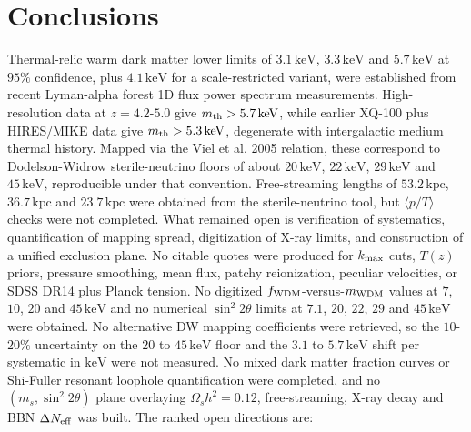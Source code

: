 \documentclass[11pt,a4paper]{article}
\begin{document}
\section{Conclusions}
Thermal-relic warm dark matter lower limits of $3.1\,\mathrm{keV}$, $3.3\,\mathrm{keV}$ and $5.7\,\mathrm{keV}$ at $95\%$ confidence, plus $4.1\,\mathrm{keV}$ for a scale-restricted variant, were established from recent Lyman-alpha forest 1D flux power spectrum measurements. High-resolution data at $z = 4.2$-$5.0$ give $m_{\rm th} > 5.7\,\mathrm{keV}$, while earlier XQ-100 plus HIRES/MIKE data give $m_{\rm th} > 5.3\,\mathrm{keV}$, degenerate with intergalactic medium thermal history. Mapped via the Viel et al. 2005 relation, these correspond to Dodelson-Widrow sterile-neutrino floors of about $20\,\mathrm{keV}$, $22\,\mathrm{keV}$, $29\,\mathrm{keV}$ and $45\,\mathrm{keV}$, reproducible under that convention. Free-streaming lengths of $53.2\,\mathrm{kpc}$, $36.7\,\mathrm{kpc}$ and $23.7\,\mathrm{kpc}$ were obtained from the sterile-neutrino tool, but $\langle p/T \rangle$ checks were not completed. What remained open is verification of systematics, quantification of mapping spread, digitization of X-ray limits, and construction of a unified exclusion plane. No citable quotes were produced for $k_{\rm max}$ cuts, $T(z)$ priors, pressure smoothing, mean flux, patchy reionization, peculiar velocities, or SDSS DR14 plus Planck tension. No digitized $f_{\rm WDM}$-versus-$m_{\rm WDM}$ values at $7$, $10$, $20$ and $45\,\mathrm{keV}$ and no numerical $\sin^2 2\theta$ limits at $7.1$, $20$, $22$, $29$ and $45\,\mathrm{keV}$ were obtained. No alternative DW mapping coefficients were retrieved, so the $10$-$20\%$ uncertainty on the $20$ to $45\,\mathrm{keV}$ floor and the $3.1$ to $5.7\,\mathrm{keV}$ shift per systematic in $\mathrm{keV}$ were not measured. No mixed dark matter fraction curves or Shi-Fuller resonant loophole quantification were completed, and no $(m_s, \sin^2 2\theta)$ plane overlaying $\Omega_s h^2 = 0.12$, free-streaming, X-ray decay and BBN $\Delta N_{\rm eff}$ was built. The ranked open directions are:
\end{document}
